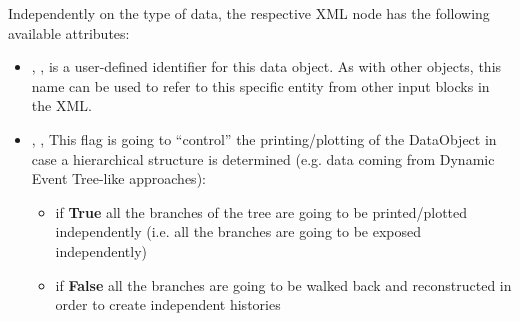 Independently on the type of data, the respective XML node has the following
available attributes:
\vspace{-5mm}
\begin{itemize}
  \itemsep0em
  \item {}, , is a user-defined
  identifier for this data object.
  \nb As with other objects, this name can be used to refer to this specific
  entity from other input blocks in the XML.

  \item {}, ,
  This flag is going to ``control'' the printing/plotting of the DataObject in
  case a hierarchical structure is determined (e.g.
  data coming from Dynamic Event Tree-like approaches):
  \begin{itemize}
    \item if \textbf{True} all the branches of the tree are going to be printed/plotted independently
               (i.e. all the branches are going to be exposed independently)
    \item if \textbf{False} all the branches are going to be walked back and reconstructed in order to create independent histories
  \end{itemize}
\end{itemize}
